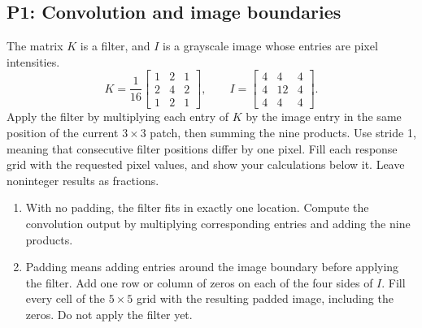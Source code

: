 \documentclass[11pt]{article}
\newenvironment{studentanswer}[1]
  {\par\medskip\noindent
   \begin{tcolorbox}[height from=#1 to 100cm, colback=white, colframe=gray!60,
     boxrule=0.6pt, arc=0pt, outer arc=0pt, left=7pt, right=7pt,
     top=7pt, bottom=7pt, title={Answer / work}, fonttitle=\small,
     coltitle=black, colbacktitle=gray!8, titlerule=0pt]
   \ignorespaces}
  {\end{tcolorbox}\par}
\begin{document}
\subsection*{P1: Convolution and image boundaries}
The matrix $K$ is a filter, and $I$ is a grayscale image whose entries
are pixel intensities.
\[
K=\frac1{16}\begin{bmatrix}1&2&1\\2&4&2\\1&2&1\end{bmatrix},
\qquad
I=\begin{bmatrix}4&4&4\\4&12&4\\4&4&4\end{bmatrix}.
\]
Apply the filter by multiplying each entry of $K$ by the image entry
in the same position of the current $3\times3$ patch, then summing
the nine products. Use stride 1, meaning that consecutive filter
positions differ by one pixel. Fill each response grid with the
requested pixel values, and show your calculations below it. Leave
noninteger results as fractions.
\begin{enumerate}[label=(\alph*)]
\item \begin{minipage}[t]{\linewidth} With no padding, the filter fits in exactly one location.
Compute the convolution output by multiplying corresponding entries
and adding the nine products.

\begin{studentanswer}{3.5cm}
\begin{center}
\end{center}
\end{studentanswer}

\end{minipage}
\item \begin{minipage}[t]{\linewidth} Padding means adding entries around the image boundary before
applying the filter. Add one row or column of zeros on each of the four
sides of $I$. Fill every cell of the $5\times5$ grid with the resulting
padded image, including the zeros. Do not apply the filter yet.

\begin{studentanswer}{5cm}
\begin{center}
\end{center}
\end{studentanswer}

\end{minipage}
\end{enumerate}
\end{document}
